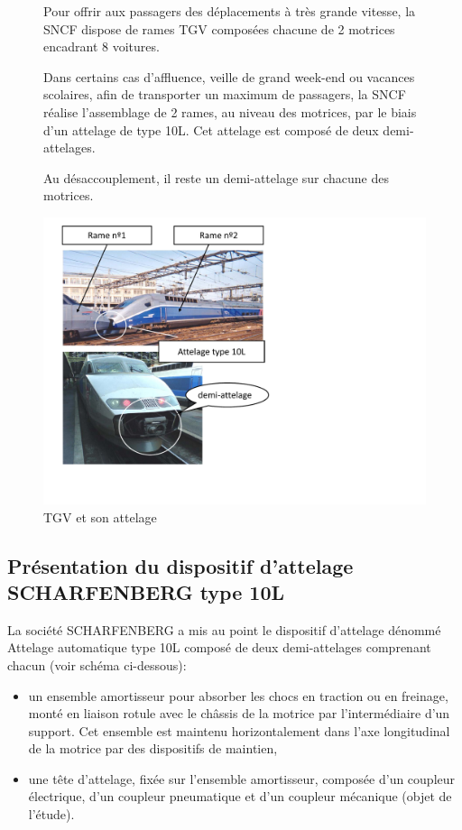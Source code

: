 \begin{figure}[!h]
 \begin{minipage}{0.6\linewidth}
Pour offrir aux passagers des déplacements à très grande vitesse, la SNCF dispose de rames TGV composées chacune de 2 motrices encadrant 8 voitures.

Dans certains cas d'affluence, veille de \og grand week-end \fg ou vacances scolaires, afin de transporter un maximum de passagers, la SNCF réalise l'assemblage de 2 rames, au niveau des motrices, par le biais d'un attelage de type 10L. Cet attelage est composé de deux demi-attelages.

Au désaccouplement, il reste un demi-attelage sur chacune des motrices.
 \end{minipage}
\hfill
 \begin{minipage}{0.35\linewidth}
  \centering\includegraphics[width=\linewidth]{img/Image1.pdf}
  \caption{TGV et son attelage}
  \label{img:image1}
 \end{minipage}
\end{figure}

\subsection{Présentation du dispositif d'attelage SCHARFENBERG type 10L}

La société SCHARFENBERG a mis au point le dispositif d'attelage dénommé \og Attelage automatique type 10L \fg composé de deux demi-attelages comprenant chacun (voir schéma ci-dessous):
\begin{itemize}
 \item un ensemble amortisseur pour absorber les chocs en traction ou en freinage, monté en liaison rotule avec le châssis de la motrice par l'intermédiaire d'un support. Cet ensemble est maintenu horizontalement dans l'axe longitudinal de la motrice par des dispositifs de maintien,
 \item une tête d'attelage, fixée sur l'ensemble amortisseur, composée d'un coupleur électrique, d'un coupleur pneumatique et d'un coupleur mécanique (objet de l'étude).
\end{itemize}

